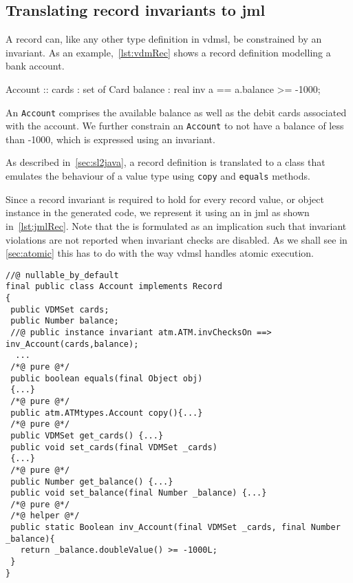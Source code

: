 \subsection{Translating record invariants to \ac{jml}}
\label{sub:rec-inv}

A record can, like any other type definition in \ac{vdmsl}, be
constrained by an invariant. As an example,~\autoref{lst:vdmRec} shows
a record definition modelling a bank account.

\begin{vdmsl}[style=customVdm,caption={A \ac{vdmsl} record definition
modelling a bank account.},label={lst:vdmRec}]
Account :: 
 cards : set of Card
 balance : real
 inv a == a.balance >= -1000;
\end{vdmsl}

An \texttt{Account} comprises the available balance as well as the
debit cards associated with the account. We further constrain an
\texttt{Account} to not have a balance of less than -1000, which is
expressed using an invariant.

As described in~\autoref{sec:sl2java}, a record definition is
translated to a class that emulates the behaviour of a value type
using \texttt{copy} and \texttt{equals} methods.

Since a record invariant is required to hold for every record value,
or object instance in the generated code, we represent it using an
 in \ac{jml} as shown
in~\autoref{lst:jmlRec}. Note that the   is
formulated as an implication such that invariant violations are not
reported when invariant checks are disabled. As we shall see in
\autoref{sec:atomic} this has to do with the way \ac{vdmsl} handles
atomic execution.


\begin{lstlisting}[float,style=customJml,caption={Code-generated version
of the \texttt{Account} record.},label={lst:jmlRec}]
//@ nullable_by_default
final public class Account implements Record
{
 public VDMSet cards;
 public Number balance;
 //@ public instance invariant atm.ATM.invChecksOn ==> inv_Account(cards,balance);
  ...
 /*@ pure @*/
 public boolean equals(final Object obj)
 {...}
 /*@ pure @*/
 public atm.ATMtypes.Account copy(){...}
 /*@ pure @*/
 public VDMSet get_cards() {...}
 public void set_cards(final VDMSet _cards)
 {...}
 /*@ pure @*/
 public Number get_balance() {...}
 public void set_balance(final Number _balance) {...}
 /*@ pure @*/
 /*@ helper @*/
 public static Boolean inv_Account(final VDMSet _cards, final Number _balance){
   return _balance.doubleValue() >= -1000L;
 }
}
\end{lstlisting}

